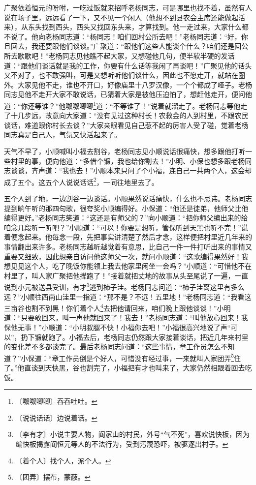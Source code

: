 \documentclass[12pt,UTF-8,openany]{ctexbook}
\begin{document}
\begin{large}
    广聚依着恒元的吩咐，一吃过饭就来招呼老杨同志，可是哪里也找不着，虽然有人说在场子里，远远看了一下，又不见一个闲人（他想不到县农会主席还能做起活来），从东头找到西头，西头又找回东头来，才算找到。他一走过来，大家什么都不说了。他向老杨同志道：“杨同志！咱们回村公所去吧！”老杨同志道：“好，你且回去，我还要跟他们谈谈。”广聚道：“跟他们这些人能谈个什么？咱们还是回公所去歇歇吧！”老杨同志见他瞧不起大家，又想碰他几句，便半软半硬的发话道：“跟他们谈话就是我的工作，你要有什么话等我闲了再谈吧！”广聚见他的话头又不对了，也不敢强叫，可是又想听听他们谈什么，因此也不愿走开，就站在圈外。大家见他不走，谁也不开口，好像庙里十八罗汉像，一个个都成了哑子。老杨同志见他不走开大家不敢说话，已猜着大家是被他压迫怕了，想赶他走开，便问他道：“你还等谁？”他呶呶唧唧\footnote{〔呶呶唧唧〕吞吞吐吐。}道：“不等谁了！”说着就溜走了。老杨同志等他走了十几步远，故意向大家道：“没有见过这种村长！农救会的人到村里，不跟农民谈话，难道跟你村长去谈？”大家亲眼看见自己惹不起的厉害人受了碰，觉着老杨同志真是自己人，气氛又快活起来了。
    
    天气不早了，小顺喊叫小福去割谷，老杨同志见小顺说话很痛快，想多跟他打听一些村里的事，便向他道：“多借个镰，我也给你割去！”小明、小保也想多跟老杨同志谈谈，齐声道：“我也去！”小顺本来只问了个小福，连自己一共两个人，这会却成了五个。这五个人说说话话\footnote{〔说说话话〕边说着话。}，一同往地里去了。
    
    五个人到了地，一边割谷一边谈话。小顺果然说话痛快，什么也不忌讳。老杨同志提到晌午听的那四句歌，很夸奖小顺编得好。小保道：“他还是徒弟，他师父比他编得更好。”老杨同志笑道：“这还是有师父的？”向小顺道：“把你师父编出来的给咱念几段听一听吧？”小顺道：“可以！你要是想听，管保听到天黑也听不完！”说着便念起来。他每念一段，先把事实讲清楚了然后才念，这样便把村里近几年来的事情翻出来许多。老杨同志越听越觉着有意思，比自己一件一件打听出来的事情又重要又细致，因此想亲自访问他这师父一次，就问小顺道：“这歌编得果然好！我想见见这个人，吃了晚饭你能领上我去他家里闲坐一会吗？”小顺道：“可惜他不在村里了，叫人家广聚把他撵跑了！”接着就把丈地的故事从头至尾说了一遍，一直说到小元被送县受训，有才\footnote{〔李有才〕小说主要人物，阎家山的村民，外号“气不死”，喜欢说快板，因为编快板揭露阎恒元等人的不法行为，受到污蔑恐吓，被驱逐出村子。}逃到柿子洼。老杨同志问道：“柿子洼离这里有多么远？”小顺往西南山洼里一指道：“那不是？不远！五里地！”老杨同志道：“我看这三亩谷也割不到黑！你们着个人\footnote{〔着个人〕找个人，派个人。}去把他请回来，咱们晚上跟他谈谈！”小明道：“只要敢回来，叫一声他就回来了！我去！”老杨同志道：“叫他放心回来！我保他无事！”小顺道：“小明叔腿不快！小福你去吧！”小福很高兴地说了声“可以”，扔下镰就跑了。小福去后，老杨同志仍然跟大家接着谈话，把近几年来村里的变化差不多都谈完了。最后老杨同志问道：“这些事情，章工作员怎么不知道？”小保道：“章工作员倒是个好人，可惜没有经过事，一来就叫人家团弄\footnote{〔团弄〕摆布，蒙蔽。}住了。”他直谈到天快黑，谷也割完了，小福把有才也叫来了，大家仍然相跟着回去吃饭。
    

\end{large}
\end{document}

